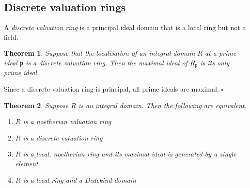 \documentclass[10pt]{article}
\newcommand{\qed}{\square}
\newtheorem{theorem}{Theorem}[section]
\newenvironment{proof}[1][Proof]{\begin{trivlist}
\item[\hskip \labelsep {\bfseries #1}]}{\end{trivlist}}
\newenvironment{definition}[1][Definition]{\begin{trivlist}
\item[\hskip \labelsep {\bfseries #1}]}{\end{trivlist}}
\begin{document}
\subsection{Discrete valuation rings}

\begin{definition}
A \emph{discrete valuation ring} is a principal ideal domain that is a local ring but not a field.
\end{definition}

\begin{theorem} \label{locprimemax}
Suppose that the localisation of an integral domain $R$ at a prime ideal $\mathfrak{p}$ is a discrete valuation ring. Then the maximal ideal of $R_{\mathfrak{p}}$ is its only prime ideal.
\end{theorem}

\begin{proof}
Since a discrete valuation ring is principal, all prime ideals are maximal. $\qed$
\end{proof}

\begin{theorem} \label{localded}
Suppose $R$ is an integral domain. Then the following are equivalent.
\begin{enumerate}
\item $R$ is a noetherian valuation ring
\item $R$ is a discrete valuation ring
\item $R$ is a local, noetherian ring and its maximal ideal is generated by a single element
\item $R$ is a local ring and a Dedekind domain
\end{enumerate}
\end{theorem}
\end{document}
